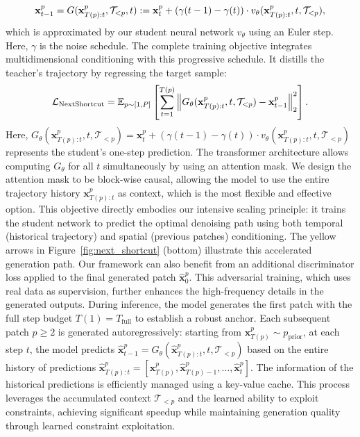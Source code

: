 \documentclass{article}
\theoremstyle{plain}
\theoremstyle{definition}
\theoremstyle{remark}
\begin{document}
\begin{equation}
\tiny
\mathbf{x}_{t-1}^p=G(\mathbf{x}_{T(p):t}^p, \mathcal{T}_{<p}, t):=\mathbf{x}_t^p + (\gamma(t-1) - \gamma(t)) \cdot v_\theta(\mathbf{x}_{T(p):t}^p, t, \mathcal{T}_{<p}),
\end{equation}
which is approximated by our student neural network $v_\theta$ using an Euler step. Here, $\gamma$ is the noise schedule. The complete training objective integrates multidimensional conditioning with this progressive schedule. It distills the teacher's trajectory by regressing the target sample:
\begin{equation}
\footnotesize
\mathcal{L}_{\text{NextShortcut}} = \mathbb{E}_{p \sim [1,P]} \left[ \sum_{t=1}^{T(p)} \left\| G_{\theta}(\mathbf{x}_{T(p):t}^p, t, \mathcal{T}_{<p}) - \mathbf{x}_{t-1}^p \right\|_2^2 \right].
\label{eq:our_loss}
\end{equation}
Here, $G_{\theta}(\mathbf{x}_{T(p):t}^p, t, \mathcal{T}_{<p}) = \mathbf{x}_t^p + (\gamma(t-1) - \gamma(t)) \cdot v_\theta(\mathbf{x}_{T(p):t}^p, t, \mathcal{T}_{<p})$ represents the student's one-step prediction. The transformer architecture allows computing $G_{\theta}$ for all $t$ simultaneously by using an attention mask. We design the attention mask to be block-wise causal, allowing the model to use the entire trajectory history $\mathbf{x}_{T(p):t}^p$ as context, which is the most flexible and effective option. This objective directly embodies our intensive scaling principle: it trains the student network to predict the optimal denoising path using both temporal (historical trajectory) and spatial (previous patches) conditioning. The yellow arrows in Figure~\ref{fig:next_shortcut} (bottom) illustrate this accelerated generation path. Our framework can also benefit from an additional discriminator loss applied to the final generated patch $\hat{\mathbf{x}}_0^p$. This adversarial training, which uses real data as supervision, further enhances the high-frequency details in the generated outputs. During inference, the model generates the first patch with the full step budget $T(1) = T_{\text{full}}$ to establish a robust anchor. Each subsequent patch $p \geq 2$ is generated autoregressively: starting from $\mathbf{x}_{T(p)}^p \sim p_{\text{prior}}$, at each step $t$, the model predicts $\hat{\mathbf{x}}_{t-1}^p = G_{\theta}(\hat{\mathbf{x}}_{T(p):t}^p, t, \mathcal{T}_{<p})$ based on the entire history of predictions $\hat{\mathbf{x}}_{T(p):t}^p = [\mathbf{x}_{T(p)}^p, \hat{\mathbf{x}}_{T(p)-1}^p, \dots, \hat{\mathbf{x}}_{t}^p]$. The information of the historical predictions is efficiently managed using a key-value cache. This process leverages the accumulated context $\mathcal{T}_{<p}$ and the learned ability to exploit constraints, achieving significant speedup while maintaining generation quality through learned constraint exploitation.
\end{document}
